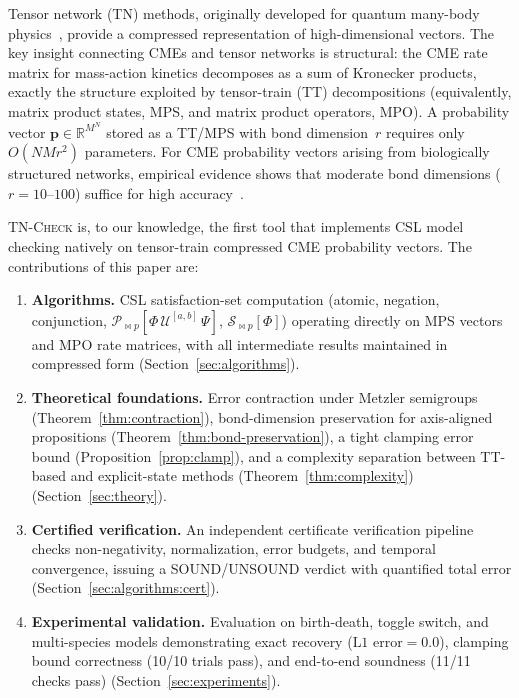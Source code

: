 \documentclass[11pt]{article}
\newcommand{\tncheck}{\textsc{TN-Check}}
\newcommand{\R}{\mathbb{R}}
\begin{document}
Tensor network (TN) methods, originally developed for quantum many-body
physics~\cite{white1992,schollwoeck2011}, provide a compressed representation
of high-dimensional vectors.
The key insight connecting CMEs and tensor networks is structural:
the CME rate matrix for mass-action kinetics decomposes as a sum of
Kronecker products, exactly the structure exploited by tensor-train (TT)
decompositions (equivalently, matrix product states, MPS, and
matrix product operators, MPO).
A probability vector $\mathbf{p} \in \R^{M^N}$ stored as a TT/MPS with
bond dimension~$r$ requires only $O(NMr^2)$ parameters.
For CME probability vectors arising from biologically structured networks,
empirical evidence shows that moderate bond dimensions ($r = 10$--$100$)
suffice for high accuracy~\cite{kazeev2014,ion2021}.

\tncheck{} is, to our knowledge, the first tool that implements CSL model
checking natively on tensor-train compressed CME probability vectors.
The contributions of this paper are:

\begin{enumerate}[leftmargin=*,itemsep=2pt]
\item \textbf{Algorithms.}
  CSL satisfaction-set computation (atomic, negation, conjunction,
  $\mathcal{P}_{\bowtie p}[\Phi\,\mathcal{U}^{[a,b]}\,\Psi]$,
  $\mathcal{S}_{\bowtie p}[\Phi]$) operating directly on MPS vectors
  and MPO rate matrices, with all intermediate results maintained in
  compressed form (Section~\ref{sec:algorithms}).

\item \textbf{Theoretical foundations.}
  Error contraction under Metzler semigroups (Theorem~\ref{thm:contraction}),
  bond-dimension preservation for axis-aligned propositions
  (Theorem~\ref{thm:bond-preservation}),
  a tight clamping error bound (Proposition~\ref{prop:clamp}),
  and a complexity separation between TT-based and explicit-state
  methods (Theorem~\ref{thm:complexity}) (Section~\ref{sec:theory}).

\item \textbf{Certified verification.}
  An independent certificate verification pipeline checks
  non-negativity, normalization, error budgets, and temporal
  convergence, issuing a SOUND/UNSOUND verdict with quantified
  total error (Section~\ref{sec:algorithms:cert}).

\item \textbf{Experimental validation.}
  Evaluation on birth-death, toggle switch, and multi-species
  models demonstrating exact recovery ($\text{L1 error} = 0.0$),
  clamping bound correctness (10/10 trials pass), and end-to-end
  soundness (11/11 checks pass) (Section~\ref{sec:experiments}).
\end{enumerate}
\end{document}
